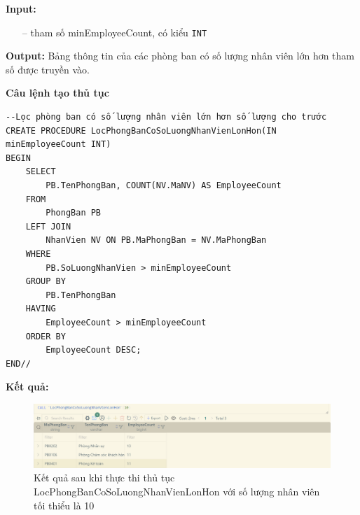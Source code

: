 \textbf{Input:}
\begin{itemize}
    \item [--] tham số minEmployeeCount, có kiểu \texttt{INT}
\end{itemize}

\textbf{Output:} Bảng thông tin của các phòng ban có số lượng nhân viên lớn hơn tham số được truyền vào.

\textbf{Câu lệnh tạo thủ tục}
\begin{verbatim}
--Lọc phòng ban có số lượng nhân viên lớn hơn số lượng cho trước
CREATE PROCEDURE LocPhongBanCoSoLuongNhanVienLonHon(IN minEmployeeCount INT)
BEGIN
    SELECT 
        PB.TenPhongBan, COUNT(NV.MaNV) AS EmployeeCount
    FROM 
        PhongBan PB
    LEFT JOIN 
        NhanVien NV ON PB.MaPhongBan = NV.MaPhongBan
    WHERE 
        PB.SoLuongNhanVien > minEmployeeCount
    GROUP BY 
        PB.TenPhongBan
    HAVING 
        EmployeeCount > minEmployeeCount
    ORDER BY 
        EmployeeCount DESC;
END//
\end{verbatim}

\textbf{Kết quả:} 
\begin{figure}[H]
    \centering
    \includegraphics[width=\linewidth]{content/images/procedure_2.png}
    \caption{Kết quả sau khi thực thi thủ tục LocPhongBanCoSoLuongNhanVienLonHon với số lượng nhân viên tối thiểu là 10}
    \label{fig:procedure_2}
\end{figure}
\newpage